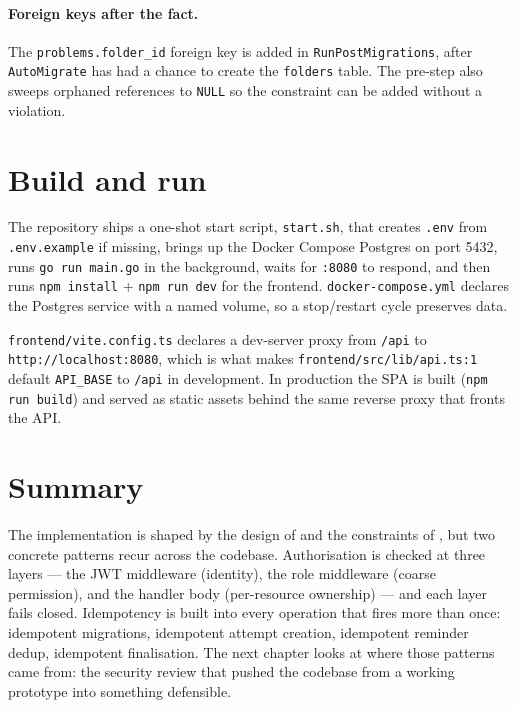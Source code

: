 \paragraph{Foreign keys after the fact.} The \texttt{problems.folder\_id} foreign key is added in \texttt{RunPostMigrations}, after \texttt{AutoMigrate} has had a chance to create the \texttt{folders} table. The pre-step also sweeps orphaned references to \texttt{NULL} so the constraint can be added without a violation.

\section{Build and run}

The repository ships a one-shot start script, \texttt{start.sh}, that creates \texttt{.env} from \texttt{.env.example} if missing, brings up the Docker Compose Postgres on port 5432, runs \texttt{go run main.go} in the background, waits for \texttt{:8080} to respond, and then runs \texttt{npm install} + \texttt{npm run dev} for the frontend. \texttt{docker-compose.yml} declares the Postgres service with a named volume, so a stop/restart cycle preserves data.

\texttt{frontend/vite.config.ts} declares a dev-server proxy from \texttt{/api} to \texttt{http://localhost:8080}, which is what makes \texttt{frontend/src/lib/api.ts:1} default \texttt{API\_BASE} to \texttt{/api} in development. In production the SPA is built (\texttt{npm run build}) and served as static assets behind the same reverse proxy that fronts the API.

\section{Summary}

The implementation is shaped by the design of  and the constraints of , but two concrete patterns recur across the codebase. Authorisation is checked at three layers --- the JWT middleware (identity), the role middleware (coarse permission), and the handler body (per-resource ownership) --- and each layer fails closed. Idempotency is built into every operation that fires more than once: idempotent migrations, idempotent attempt creation, idempotent reminder dedup, idempotent finalisation. The next chapter looks at where those patterns came from: the security review that pushed the codebase from a working prototype into something defensible.
